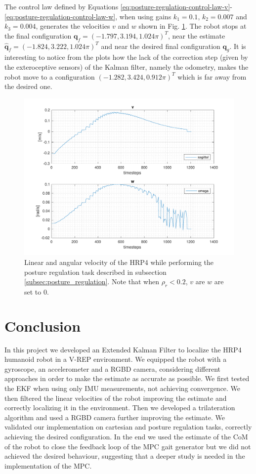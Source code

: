 \documentclass[a4paper]{article}
\begin{document}
The control law defined by Equations
\ref{eq:posture-regulation-control-law-v}-\ref{eq:posture-regulation-control-law-w},
when using gains $k_1=0.1$, $k_2=0.007$ and $k_3=0.004$,
generates the velocities $v$ and $w$ shown in Fig. \ref{fig:unicycle_velocities_posture_regulation}. The robot stops at the final
configuration $\bm{q}_f = (-1.797, 3.194, 1.024\pi)^T$, near the estimate
$\bm{\hat{q}}_f = (-1.824, 3.222, 1.024\pi)^T$ and
near the desired final configuration $\bm{q}_g$. It is interesting to notice
from the plots how the lack of the correction step (given by the exteroceptive
sensors) of the Kalman filter, namely the odometry, makes the robot move to a configuration
$(-1.282, 3.424, 0.912\pi)^T$ which is far away from the desired one.
\begin{figure}
    \centering
    \includegraphics[width=\textwidth]{images/unicycle_velocities}
    \caption{Linear and angular velocity of the HRP4 while performing the
        posture regulation task described in subsection \ref{subsec:posture_regulation}.
        Note that when $\rho_r < 0.2$, $v$ are $w$ are set to 0.}
    \label{fig:unicycle_velocities_posture_regulation}
\end{figure}

\clearpage
\section{Conclusion}
In this project we developed an Extended Kalman Filter to localize the HRP4
humanoid robot in a V-REP environment. We equipped the robot with a gyroscope,
an accelerometer and a RGBD camera, considering different approaches in order
to make the estimate as accurate as possible. We first tested the EKF when
using only IMU measurements, not achieving convergence. We then filtered the
linear velocities of the robot improving the estimate and correctly localizing
it in the environment. Then we developed a trilateration algorithm
and used a RGBD camera further improving the estimate. We validated our
implementation on cartesian and posture regulation tasks, correctly
achieving the desired configuration. In the end we used the estimate of the
CoM of the robot to close the feedback loop of the MPC gait generator but we did not
achieved the desired behaviour, suggesting that a deeper study is needed in the
implementation of the MPC.
\end{document}

